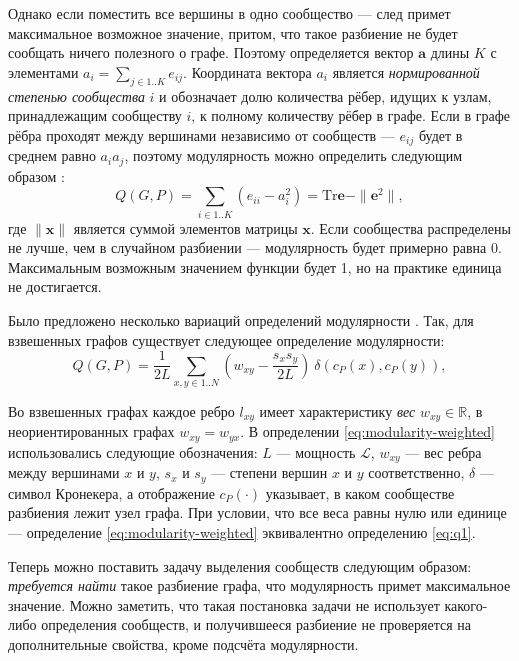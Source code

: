 Однако если поместить все вершины в одно сообщество --- след примет максимальное возможное значение, притом, что такое разбиение не будет сообщать ничего полезного о графе. Поэтому определяется вектор $\mathbf{a}$ длины $K$ с элементами $a_i = \sum_{j \in 1..K}{e_{ij}}$. Координата вектора $a_i$ является \emph{нормированной степенью сообщества} $i$ и обозначает долю количества рёбер, идущих к узлам, принадлежащим сообществу $i$, к полному количеству рёбер в графе. Если в графе рёбра проходят между вершинами независимо от сообществ --- $e_{ij}$ будет в среднем равно $a_i a_j$, поэтому модулярность можно определить следующим образом \cite{Newman&Girvan:2004}:
\begin{equation} \label{eq:q1}
Q(G, P) = \sum_{i \in 1..K}{\left(e_{ii} - a_i^2\right)} = \mathrm{Tr} \mathbf{e} - \|\mathbf{e}^2\|,
\end{equation}
где $\|\mathbf{x}\|$ является суммой элементов матрицы $\mathbf{x}$. Если сообщества распределены не лучше, чем в случайном разбиении --- модулярность будет примерно равна 0. Максимальным возможным значением функции будет 1, но на практике единица не достигается.

Было предложено несколько вариаций определений модулярности \cite{Muff&Rao&Caflisch:2005, Fortunato&Barthelemy:2007}. Так, для взвешенных графов существует следующее определение модулярности:
\begin{equation}\label{eq:modularity-weighted}
Q(G, P) = \frac{1}{2L} \sum_{x, y \in 1..N} \left(w_{xy} - \frac{s_x s_y}{2L}\right)\ \delta(c_P(x), c_P(y)),
\end{equation}

Во взвешенных графах каждое ребро $l_{xy}$ имеет характеристику \emph{вес} $w_{xy} \in \mathbb{R}$, в неориентированных графах $w_{xy} = w_{yx}$. В определении \eqref{eq:modularity-weighted} использовались следующие обозначения: $L$ --- мощность $\mathscr{L}$, $w_{xy}$ --- вес ребра между вершинами $x$ и $y$, $s_x$ и $s_y$ --- степени вершин $x$ и $y$ соответственно, $\delta$ --- символ Кронекера, а отображение $c_P(\cdot)$ указывает, в каком сообществе разбиения лежит узел графа. При условии, что все веса равны нулю или единице --- определение \ref{eq:modularity-weighted} эквивалентно определению \eqref{eq:q1}.

Теперь можно поставить задачу выделения сообществ следующим образом: \emph{требуется найти} такое разбиение графа, что модулярность примет максимальное значение. Можно заметить, что такая постановка задачи не использует какого-либо определения сообществ, и получившееся разбиение не проверяется на дополнительные свойства, кроме подсчёта модулярности.

